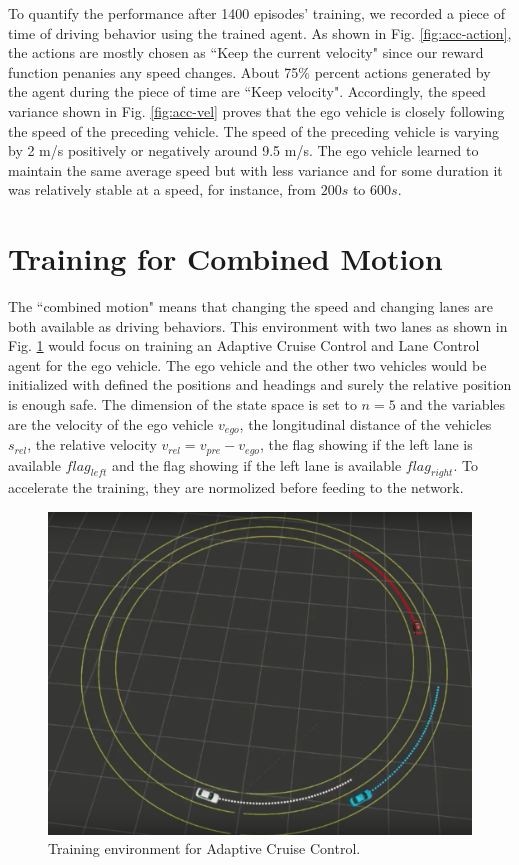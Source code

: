 To quantify the performance after 1400 episodes' training, we recorded a piece of time of driving behavior using the trained agent. As shown in Fig. \ref{fig:acc-action}, the actions are mostly chosen as ``Keep the current velocity" since our reward function penanies any speed changes. About 75\% percent actions generated by the agent during the piece of time are ``Keep velocity". Accordingly, the speed variance shown in Fig. \ref{fig:acc-vel} proves that the ego vehicle is closely following the speed of the preceding vehicle. The speed of the preceding vehicle is varying by 2 m/s positively or negatively around 9.5 m/s. The ego vehicle learned to maintain the same average speed but with less variance and for some duration it was relatively stable at a speed, for instance, from $200s$ to $600s$.

\section{Training for Combined Motion}

The ``combined motion" means that changing the speed and changing lanes are both available as driving behaviors. This environment with two lanes as shown in Fig. \ref{fig:auto-env} would focus on training an Adaptive Cruise Control and Lane Control agent for the ego vehicle. The ego vehicle and the other two vehicles would be initialized with defined the positions and headings and surely the relative position is enough safe. The dimension of the state space is set to $n = 5$ and the variables are the velocity of the ego vehicle $v_{ego}$, the longitudinal distance of the vehicles $s_{rel}$, the relative velocity $v_{rel} = v_{pre} - v_{ego}$, the flag showing if the left lane is available $flag_{left}$ and the flag showing if the left lane is available $flag_{right}$. To accelerate the training, they are normolized before feeding to the network.

\begin{figure}[h]
\centering
\includegraphics[width=1.0\textwidth]{figs/ch5/auto-env}
\caption{Training environment for Adaptive Cruise Control.}
\label{fig:auto-env}
\end{figure}

